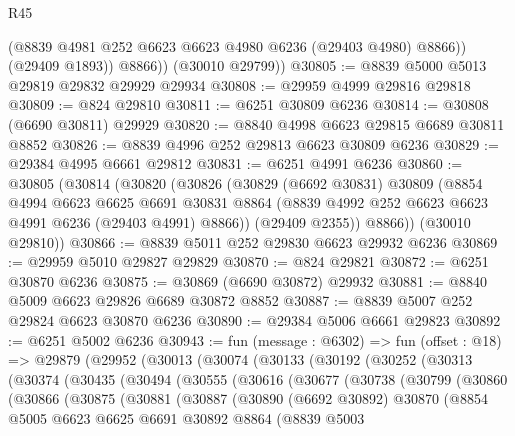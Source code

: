 \begin{lexlean}{R45}
\begin{coremodule}
{              (@8839 @4981 @252 @6623 @6623 @4980 @6236 (@29403 @4980) @8866))
            (@29409 @1893))
          @8866))
      (@30010 @29799))
@30805 := @8839 @5000 @5013 @29819 @29832 @29929 @29934
@30808 := @29959 @4999 @29816 @29818
@30809 := @824 @29810
@30811 := @6251 @30809 @6236
@30814 := @30808 (@6690 @30811) @29929
@30820 := @8840 @4998 @6623 @29815 @6689 @30811 @8852
@30826 := @8839 @4996 @252 @29813 @6623 @30809 @6236
@30829 := @29384 @4995 @6661 @29812
@30831 := @6251 @4991 @6236
@30860 := @30805
    (@30814
      (@30820
        (@30826
          (@30829
            (@6692 @30831)
            @30809
            (@8854
              @4994
              @6623
              @6625
              @6691
              @30831
              @8864
              (@8839 @4992 @252 @6623 @6623 @4991 @6236 (@29403 @4991) @8866))
            (@29409 @2355))
          @8866))
      (@30010 @29810))
@30866 := @8839 @5011 @252 @29830 @6623 @29932 @6236
@30869 := @29959 @5010 @29827 @29829
@30870 := @824 @29821
@30872 := @6251 @30870 @6236
@30875 := @30869 (@6690 @30872) @29932
@30881 := @8840 @5009 @6623 @29826 @6689 @30872 @8852
@30887 := @8839 @5007 @252 @29824 @6623 @30870 @6236
@30890 := @29384 @5006 @6661 @29823
@30892 := @6251 @5002 @6236
@30943 := fun (message : @6302) =>
  fun (offset : @18) =>
  @29879
    (@29952
      (@30013
        (@30074
          (@30133
            (@30192
              (@30252
                (@30313
                  (@30374
                    (@30435
                      (@30494
                        (@30555
                          (@30616
                            (@30677
                              (@30738
                                (@30799
                                  (@30860
                                    (@30866
                                      (@30875
                                        (@30881
                                          (@30887
                                            (@30890
                                              (@6692 @30892)
                                              @30870
                                              (@8854
                                                @5005
                                                @6623
                                                @6625
                                                @6691
                                                @30892
                                                @8864
                                                (@8839
                                                  @5003
}
\end{coremodule}
\end{lexlean}

